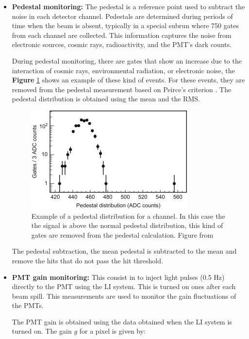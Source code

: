 \begin{itemize}
    \item \textbf{Pedestal monitoring:} The pedestal is a reference point used to subtract the noise in each detector channel. Pedestals are determined during periods of time when the beam is absent, typically in a special subrun where 750 gates from each channel are collected. This information captures the noise from electronic sources, cosmic rays, radioactivity, and the PMT's dark counts.

    During pedestal monitoring, there are gates that show an increase due to the interaction of cosmic rays, environmental radiation, or electronic noise, the \textbf{Figure} \ref{fig:MnvExp:MnvDetector:Calibration:InSitu:Pedestal} shows an example of these kind of events. For these events, they are removed from the pedestal measurement based on Peirce's criterion \cite{PeirceCriterion}. The pedestal distribution is obtained using the mean and the RMS.

    \begin{figure}[!htb]
        \centering
        \includegraphics{Figures/Chapter2/Pedestal.jpg}
        \caption{Example of a pedestal distribution for a channel. In this case the the signal is above the normal pedestal distribution, this kind of gates are removed from the pedestal calculation. Figure from \cite{MINERvA}}
        \label{fig:MnvExp:MnvDetector:Calibration:InSitu:Pedestal}
    \end{figure}
    The pedestal subtraction, the mean pedestal is subtracted to the mean and remove the hits that do not pass the hit threshold.

    
    \item \textbf{PMT gain monitoring:} This consist in to inject light pulses (0.5 Hz) directly to the PMT using the LI system. This is turned on ones after each beam spill. This measurements are used to monitor the gain fluctuations of the PMTs. 
    
    The PMT gain is obtained using the data obtained when the LI system is turned on. The gain $g$ for a pixel is given by:


\end{itemize}

